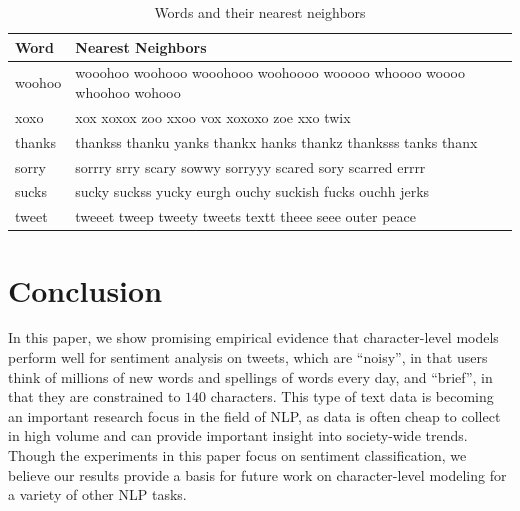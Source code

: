 \documentclass{article} %
\begin{document}
\begin{table}[h!]
\begin{center}
\begin{tabular}{|l|l|}
\hline
Word & Nearest Neighbors \\ \hline
woohoo &    wooohoo woohooo wooohooo woohoooo wooooo whoooo woooo whoohoo wohooo\\
xoxo &    xox xoxox zoo xxoo vox xoxoxo zoe xxo twix \\
thanks &    thankss thanku yanks thankx hanks thankz thanksss tanks thanx \\
sorry &    sorrry srry scary sowwy sorryyy scared sory scarred errrr \\
sucks &   sucky suckss yucky eurgh ouchy suckish fucks ouchh jerks \\
tweet  &  tweeet tweep tweety tweets textt theee seee outer peace \\
\hline
\end{tabular}
\end{center}
\caption{Words and their nearest neighbors}
\label{table:word-sim}
\end{table}

\section{Conclusion}
In this paper, we show promising empirical evidence that character-level models perform well for sentiment analysis on tweets, which are ``noisy'', in that users think of millions of new words and spellings of words every day, and ``brief'', in that they are constrained to $140$ characters. This type of text data is becoming an important research focus in the field of NLP, as data is often cheap to collect in high volume and can provide important insight into society-wide trends. Though the experiments in this paper focus on sentiment classification, we believe our results provide a basis for future work on character-level modeling for a variety of other NLP tasks.



\end{document}
